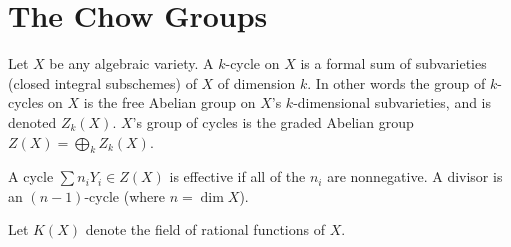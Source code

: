 \section{The Chow Groups}

\bdefn

    Let $X$ be any algebraic variety.
    A {\emphcolor $k$-cycle} on $X$ is a formal sum of subvarieties (closed integral subschemes) of $X$
    of dimension $k$.
    In other words the group of $k$-cycles on $X$ is the free Abelian group on $X$'s $k$-dimensional
    subvarieties, and is denoted $Z_k(X)$.
    $X$'s {\emphcolor group of cycles} is the graded Abelian group $Z(X)=\bigoplus_kZ_k(X)$.

    A cycle $\sum n_iY_i\in Z(X)$ is {\emphcolor effective} if all of the $n_i$ are nonnegative.
    A {\emphcolor divisor} is an $(n-1)$-cycle (where $n=\dim X$).

\edefn

\bdefn

    Let $K(X)$ denote the field of rational functions of $X$.


\edefn

\bye

